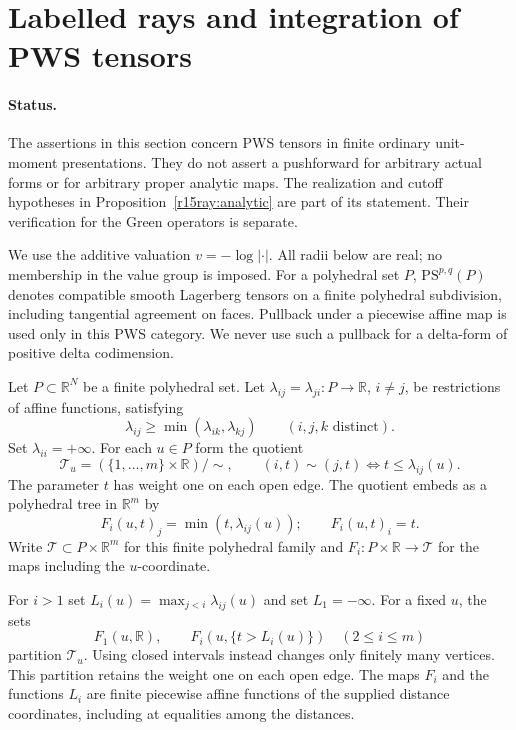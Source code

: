 \section{Labelled rays and integration of PWS tensors}
\label{r15ray:section}

\paragraph{Status.}
The assertions in this section concern PWS tensors in finite ordinary
unit-moment presentations.  They do not assert a pushforward for arbitrary
actual forms or for arbitrary proper analytic maps.  The realization and
cutoff hypotheses in Proposition~\ref{r15ray:analytic} are part of its
statement.  Their verification for the Green operators is separate.

We use the additive valuation $v=-\log|\cdot|$.  All radii below are real;
no membership in the value group is imposed.  For a polyhedral set $P$,
$\mathrm{PS}^{p,q}(P)$ denotes compatible smooth Lagerberg tensors on a
finite polyhedral subdivision, including tangential agreement on faces.
Pullback under a piecewise affine map is used only in this PWS category.
We never use such a pullback for a delta-form of positive delta codimension.

\begin{definition}
\label{r15ray:distance}
Let $P\subset\mathbb R^N$ be a finite polyhedral set.  Let
$\lambda_{ij}=\lambda_{ji}:P\to\mathbb R$, $i\ne j$, be restrictions
of affine functions, satisfying
\[
 \lambda_{ij}\geq\min(\lambda_{ik},\lambda_{kj})
 \qquad(i,j,k\text{ distinct}).                 \tag{R15.1}
\]
Set $\lambda_{ii}=+\infty$.  For each $u\in P$ form the quotient
\[
 \mathcal T_u=(\{1,\ldots,m\}\times\mathbb R)/\sim,
 \qquad (i,t)\sim(j,t)\iff t\leq\lambda_{ij}(u).
                                                        \tag{R15.2}
\]
The parameter $t$ has weight one on each open edge.  The quotient embeds
as a polyhedral tree in $\mathbb R^m$ by
\[
 F_i(u,t)_j=\min(t,\lambda_{ij}(u));\qquad F_i(u,t)_i=t.
                                                        \tag{R15.3}
\]
Write $\mathcal T\subset P\times\mathbb R^m$ for this finite
polyhedral family and $F_i:P\times\mathbb R\to\mathcal T$ for the
maps including the $u$-coordinate.
\end{definition}

\begin{lemma}
\label{r15ray:labels}
For $i>1$ set $L_i(u)=\max_{j<i}\lambda_{ij}(u)$ and set
$L_1=-\infty$.  For a fixed $u$, the sets
\[
 F_1(u,\mathbb R),\qquad
 F_i(u,\{t>L_i(u)\})\quad(2\leq i\leq m)       \tag{R15.4}
\]
partition $\mathcal T_u$.  Using closed intervals instead changes only
finitely many vertices.  This partition retains the weight one on each
open edge.  The maps $F_i$ and the functions $L_i$ are finite piecewise
affine functions of the supplied distance coordinates, including at
equalities among the distances.
\end{lemma}

